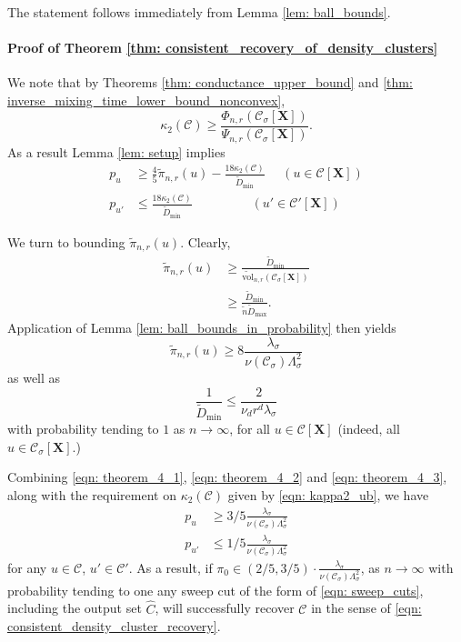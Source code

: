 \documentclass{article}
\newcommand{\vol}{\mathrm{vol}}
\newcommand{\1}{\mathbf{1}}
\newcommand{\Xbf}{\mathbf{X}}
\newcommand{\Cset}{\mathcal{C}}
\newcommand{\Csig}{\Cset_{\sigma}}
\newcommand{\wn}{\widetilde{n}}
\theoremstyle{aldenthm}
\begin{document}
The statement follows immediately from Lemma \ref{lem: ball_bounds}.

\paragraph{Proof of Theorem \ref{thm: consistent_recovery_of_density_clusters}}

We note that by Theorems \ref{thm: conductance_upper_bound} and \ref{thm: inverse_mixing_time_lower_bound_nonconvex}, 
\begin{equation*}
\kappa_2(\Cset) \geq \frac{\Phi_{n,r}(\Csig[\Xbf])}{\Psi_{n,r}(\Csig[\Xbf])}.
\end{equation*}
As a result Lemma \ref{lem: setup} implies
\begin{align}
\label{eqn: theorem_4_1}
p_u & \geq \frac{4}{5} \widetilde{\pi}_{n,r}(u) - \frac{18 \kappa_2(\Cset)}{\widetilde{D}_{\min}} ~~~~~~ (u \in \Cset[\Xbf]) \nonumber \\
p_{u'} & \leq \frac{18 \kappa_2(\Cset)}{\widetilde{D}_{\min}} ~~~~~~~~~~~~~~~~~~~~~ (u' \in \Cset'[\Xbf])
\end{align}

We turn to bounding $\widetilde{\pi}_{n,r}(u)$. Clearly,
\begin{align*}
\widetilde{\pi}_{n,r}(u) & \geq \frac{\widetilde{D}_{\min}}{\widetilde{\vol}_{n,r}(\Csig[\Xbf])} \\
& \geq \frac{\widetilde{D}_{\min}}{\wn \widetilde{D}_{\max}}.
\end{align*}
Application of Lemma \ref{lem: ball_bounds_in_probability} then yields
\begin{equation}
\label{eqn: theorem_4_2}
\widetilde{\pi}_{n,r}(u) \geq 8 \frac{\lambda_{\sigma}}{\nu(\Csig) \Lambda_{\sigma}^2}
\end{equation}
as well as
\begin{equation}
\label{eqn: theorem_4_3}
\frac{1}{\widetilde{D}_{\min}} \leq \frac{2}{\nu_d r^d \lambda_{\sigma}}
\end{equation}
with probability tending to $1$ as $n \to \infty$, for all $u \in \Cset[\Xbf]$ (indeed, all $u \in \Csig[\Xbf]$.)

Combining \eqref{eqn: theorem_4_1}, \eqref{eqn: theorem_4_2} and \eqref{eqn: theorem_4_3}, along with the requirement on $\kappa_2(\Cset)$ given by \eqref{eqn: kappa2_ub}, we have
\begin{align*}
p_u & \geq 3/5 \frac{\lambda_{\sigma}}{\nu(\Csig) \Lambda_{\sigma}^2} \\
p_{u'} & \leq 1/5 \frac{\lambda_{\sigma}}{\nu(\Csig) \Lambda_{\sigma}^2}
\end{align*}
for any $u \in \Cset$, $u' \in \Cset'$. As a result, if $\pi_0 \in (2/5, 3/5)\cdot \frac{\lambda_{\sigma}}{\nu(\Csig) \Lambda_{\sigma}^2}$, as $n \to \infty$ with probability tending to one any sweep cut of the form of \eqref{eqn: sweep_cuts}, including the output set $\widehat{C}$, will successfully recover $\Cset$ in the sense of \eqref{eqn: consistent_density_cluster_recovery}.
\end{document}
